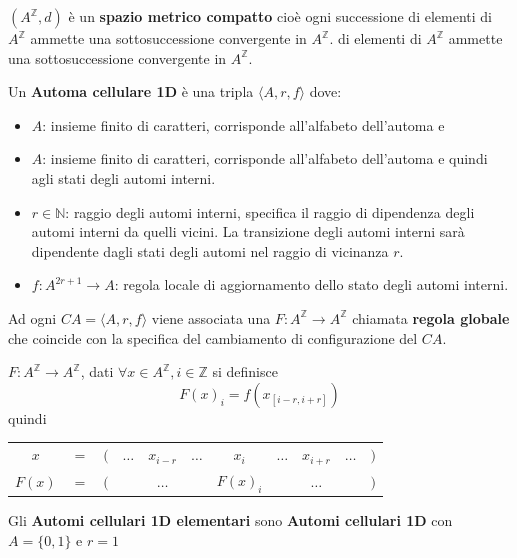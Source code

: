 \begin{nota} 
    $(A^\mathbb{Z}, d)$ è un \textbf{spazio metrico compatto} cioè ogni successione
    di elementi di $A^\mathbb{Z}$ ammette una sottosuccessione convergente in $A^\mathbb{Z}$.
    di elementi di $A^\mathbb{Z}$ ammette una sottosuccessione convergente in $A^\mathbb{Z}$.
\end{nota}
\begin{definizione} 
    Un \textbf{Automa cellulare 1D}  è una tripla $\langle A, r, f\rangle$
    dove:
    \begin{itemize}
        \item $A$: insieme finito di caratteri, corrisponde all'alfabeto dell'automa e
        \item $A$: insieme finito di caratteri, corrisponde all'alfabeto dell'automa e
              quindi agli stati degli automi interni.
        \item $r\in \mathbb{N}$: raggio degli automi interni, specifica il raggio
              di dipendenza degli automi interni da quelli vicini. La transizione degli
              automi interni sarà dipendente dagli stati degli automi nel raggio
              di vicinanza $r$.
        \item $f: A^{2r+1}\rightarrow A$: regola locale di aggiornamento dello
              stato degli automi interni.
    \end{itemize}
\end{definizione}
Ad ogni $CA = \langle A, r, f\rangle$ viene associata una $F:A^\mathbb{Z}\rightarrow A^\mathbb{Z}$
chiamata \textbf{regola globale} che coincide con la specifica del cambiamento
di configurazione del $CA$.
\begin{definizione} 
    $F:A^\mathbb{Z}\rightarrow A^\mathbb{Z}$, dati $\forall x \in A^\mathbb{Z}, i \in \mathbb{Z}$
    si definisce
    $$F(x)_i = f(x_{[i-r, i+r]})$$
    quindi
    \begin{table}[!h]
        \centering
        \begin{tabular}{ccccccccccc}
            $x$    & $=$ & $($ & $\dots$                     & $x_{i-r}$ & $\dots$                     & $x_i$ & $\dots$ & $x_{i+r}$ & $\dots$ & $)$ \\
            $F(x)$ & $=$ & $($ & \multicolumn{3}{c}{$\dots$} & $F(x)_i$  & \multicolumn{3}{c}{$\dots$} & $)$
        \end{tabular}
    \end{table}
\end{definizione}
\begin{definizione} 
    Gli \textbf{Automi cellulari 1D elementari} sono \textbf{Automi cellulari 1D}
    con $A=\{0,1\}$ e $r=1$
\end{definizione}

